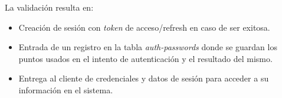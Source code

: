 La validación resulta en:
\begin{itemize}
	\item Creación de sesión con \textit{token} de acceso/refresh en caso de ser exitosa.
	\item Entrada de un registro en la tabla \textit{auth-passwords} donde se guardan los puntos usados en el intento de autenticaci\'on y el resultado del mismo.
	\item Entrega al cliente de credenciales y datos de sesi\'on para acceder a su informaci\'on en el sistema.
\end{itemize}

